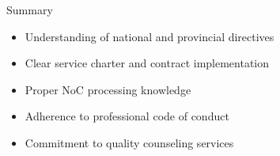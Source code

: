 \documentclass{beamer}
\begin{document}
\begin{frame}{Summary}
\begin{itemize}
    \item Understanding of national and provincial directives
    \item Clear service charter and contract implementation
    \item Proper NoC processing knowledge
    \item Adherence to professional code of conduct
    \item Commitment to quality counseling services
\end{itemize}
\end{frame}
\end{document}
